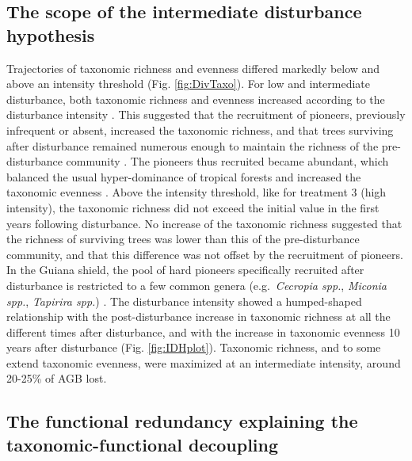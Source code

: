 \documentclass[fleqn,10pt]{ArtEcoFoG} %
\begin{document}
\hypertarget{the-scope-of-the-intermediate-disturbance-hypothesis}{%
\subsection{The scope of the intermediate disturbance hypothesis}\label{the-scope-of-the-intermediate-disturbance-hypothesis}}

Trajectories of taxonomic richness and evenness differed markedly below and above an intensity threshold (Fig. \ref{fig:DivTaxo}).
For low and intermediate disturbance, both taxonomic richness and evenness increased according to the disturbance intensity \citep{Martin2015, Chaudhary2016}.
This suggested that the recruitment of pioneers, previously infrequent or absent, increased the taxonomic richness, and that trees surviving after disturbance remained numerous enough to maintain the richness of the pre-disturbance community \citep{Bongers2009}.
The pioneers thus recruited became abundant, which balanced the usual hyper-dominance of tropical forests and increased the taxonomic evenness \citep{Baraloto2012a}.
Above the intensity threshold, like for treatment 3 (high intensity), the taxonomic richness did not exceed the initial value in the first years following disturbance.
No increase of the taxonomic richness suggested that the richness of surviving trees was lower than this of the pre-disturbance community, and that this difference was not offset by the recruitment of pioneers.
In the Guiana shield, the pool of \color{red}hard \color{black} pioneers specifically recruited after disturbance is restricted to a few common genera (e.g.~\emph{Cecropia spp.}, \emph{Miconia spp.}, \emph{Tapirira spp.}) \citep{Guitet2018}.
\color{red}The disturbance intensity showed a humped-shaped relationship with the post-disturbance increase in taxonomic richness at all the different times after disturbance, and with the increase in taxonomic evenness 10 years after disturbance (Fig. \ref{fig:IDHplot}).\color{black}
Taxonomic richness, and to some extend taxonomic evenness, were maximized at an intermediate intensity, around 20-25\% of AGB lost.

\hypertarget{the-functional-redundancy-explaining-the-taxonomic-functional-decoupling}{%
\subsection{The functional redundancy explaining the taxonomic-functional decoupling}\label{the-functional-redundancy-explaining-the-taxonomic-functional-decoupling}}
\end{document}
